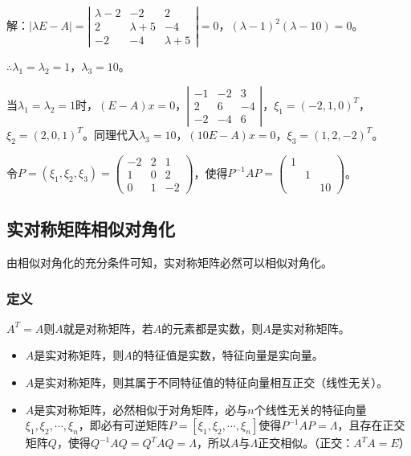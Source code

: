 \documentclass[UTF8, 12pt]{ctexart}
\begin{document}
解：$\vert\lambda E-A\vert=\left|\begin{array}{ccc}
    \lambda-2 & -2 & 2 \\
    2 & \lambda+5 & -4 \\
    -2 & -4 & \lambda+5
\end{array}\right|=0$，$(\lambda-1)^2(\lambda-10)=0$。

$\therefore\lambda_1=\lambda_2=1$，$\lambda_3=10$。

当$\lambda_1=\lambda_2=1$时，$(E-A)x=0$，$\left|\begin{array}{ccc}
    -1 & -2 & 3 \\
    2 & 6 & -4 \\
    -2 & -4 & 6
\end{array}\right|$，$\xi_1=(-2,1,0)^T$，$\xi_2=(2,0,1)^T$。同理代入$\lambda_3=10$，$(10E-A)x=0$，$\xi_3=(1,2,-2)^T$。

令$P=(\xi_1,\xi_2,\xi_3)=\left(\begin{array}{ccc}
    -2 & 2 & 1 \\
    1 & 0 & 2 \\
    0 & 1 & -2
\end{array}\right)$，使得$P^{-1}AP=\left(\begin{array}{ccc}
    1 \\
     & 1 \\
     & & 10
\end{array}\right)$。

\subsection{实对称矩阵相似对角化}

由相似对角化的充分条件可知，实对称矩阵必然可以相似对角化。

\subsubsection{定义}

$A^T=A$则$A$就是对称矩阵，若$A$的元素都是实数，则$A$是实对称矩阵。

\begin{itemize}
    \item $A$是实对称矩阵，则$A$的特征值是实数，特征向量是实向量。
    \item $A$是实对称矩阵，则其属于不同特征值的特征向量相互正交（线性无关）。
    \item $A$是实对称矩阵，必然相似于对角矩阵，必与$n$个线性无关的特征向量$\xi_1,\xi_2,\cdots,\xi_n$，即必有可逆矩阵$P=[\xi_1,\xi_2,\cdots,\xi_n]$使得$P^{-1}AP=\Lambda$，且存在正交矩阵$Q$，使得$Q^{-1}AQ=Q^TAQ=\Lambda$，所以$A$与$\Lambda$正交相似。（正交：$A^TA=E$）
\end{itemize}
\end{document}
